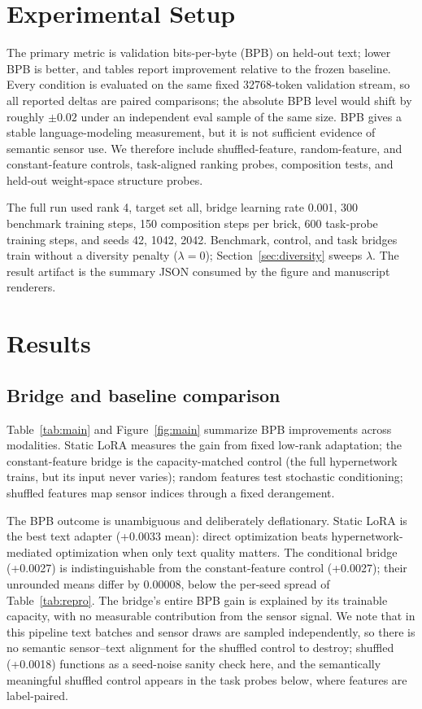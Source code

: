 \documentclass[11pt]{article}
\begin{document}
\section{Experimental Setup}
The primary metric is validation bits-per-byte (BPB) on held-out text; lower BPB is better, and tables report improvement relative to the frozen baseline. Every condition is evaluated on the same fixed 32768-token validation stream, so all reported deltas are paired comparisons; the absolute BPB level would shift by roughly $\pm 0.02$ under an independent eval sample of the same size. BPB gives a stable language-modeling measurement, but it is not sufficient evidence of semantic sensor use. We therefore include shuffled-feature, random-feature, and constant-feature controls, task-aligned ranking probes, composition tests, and held-out weight-space structure probes.

The full run used rank 4, target set all, bridge learning rate 0.001, 300 benchmark training steps, 150 composition steps per brick, 600 task-probe training steps, and seeds 42, 1042, 2042. Benchmark, control, and task bridges train without a diversity penalty ($\lambda = 0$); Section~\ref{sec:diversity} sweeps $\lambda$. The result artifact is the summary JSON consumed by the figure and manuscript renderers.

\section{Results}
\subsection{Bridge and baseline comparison}
Table~\ref{tab:main} and Figure~\ref{fig:main} summarize BPB improvements across modalities. Static LoRA measures the gain from fixed low-rank adaptation; the constant-feature bridge is the capacity-matched control (the full hypernetwork trains, but its input never varies); random features test stochastic conditioning; shuffled features map sensor indices through a fixed derangement.

The BPB outcome is unambiguous and deliberately deflationary. Static LoRA is the best text adapter (+0.0033 mean): direct optimization beats hypernetwork-mediated optimization when only text quality matters. The conditional bridge (+0.0027) is indistinguishable from the constant-feature control (+0.0027); their unrounded means differ by 0.00008, below the per-seed spread of Table~\ref{tab:repro}. The bridge's entire BPB gain is explained by its trainable capacity, with no measurable contribution from the sensor signal. We note that in this pipeline text batches and sensor draws are sampled independently, so there is no semantic sensor--text alignment for the shuffled control to destroy; shuffled (+0.0018) functions as a seed-noise sanity check here, and the semantically meaningful shuffled control appears in the task probes below, where features are label-paired.
\end{document}
